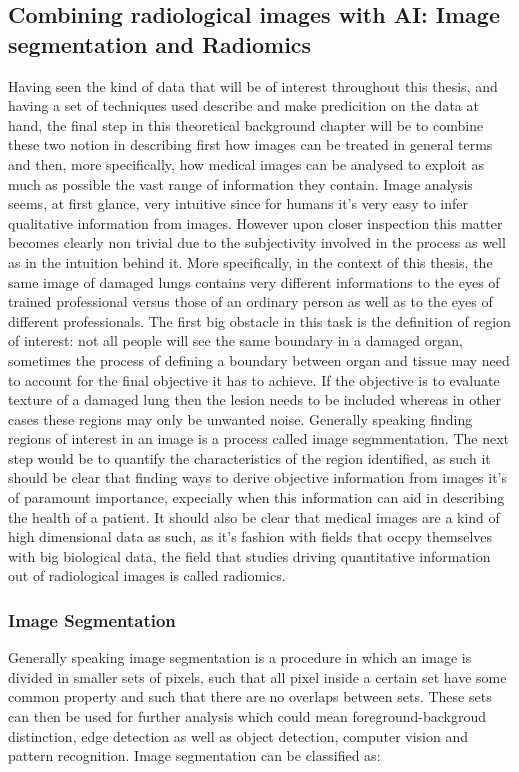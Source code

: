 \subsection{Combining radiological images  with AI: Image segmentation and Radiomics}
Having seen the kind of data that will be of interest throughout this thesis, and having a set of techniques used describe and make predicition on the data at hand, the final step in this theoretical background chapter will be to combine these two notion in describing first how images can be treated in general terms and then, more specifically, how medical images can be analysed to exploit as much as possible the vast range of information they contain.
Image analysis seems, at first glance, very intuitive since for humans it's very easy to infer qualitative information from images. However upon closer inspection this matter becomes clearly non trivial due to the subjectivity involved in the process as well as in the intuition behind it. More specifically, in the context of this thesis, the same image of damaged lungs contains very different informations to the eyes of trained professional versus those of an ordinary person as well as to the eyes of different professionals.
The first big obstacle in this task is the definition of region of interest: not all people will see the same boundary in a damaged organ, sometimes the process of defining a boundary between organ and tissue may need to account for the final objective it has to achieve. If the objective is to evaluate texture of a damaged lung then the lesion needs to be included whereas in other cases these regions may only be unwanted noise. Generally speaking finding regions of interest in an image is a process called image segmmentation.
The next step would be to quantify the characteristics of the region identified, as such it should be clear that finding ways to derive objective information from images it's of paramount importance, expecially when this information can aid in describing the health of a patient. It should also be clear that medical images are a kind of high dimensional data as such, as it's fashion with fields that occpy themselves with big biological data, the field that studies driving quantitative information out of radiological images is called radiomics. 

\subsubsection{Image Segmentation}
Generally speaking image segmentation is a procedure in which an image is divided in smaller sets of pixels, such that all pixel inside a certain set have some common property and such that there are no overlaps between sets. These sets can then be used for further analysis which could mean foreground-backgroud distinction, edge detection as well as object detection, computer vision and pattern recognition. Image segmentation can be classified as:

